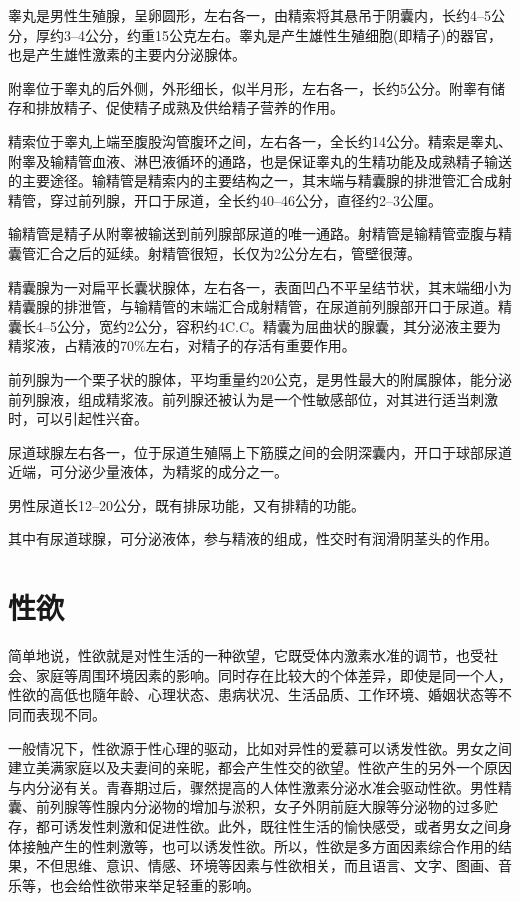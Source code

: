 \documentclass[12pt,UTF8]{ctexbook}
\begin{document}
睾丸是男性生殖腺，呈卵圆形，左右各一，由精索将其悬吊于阴囊内，长约4--5公分，厚约3--4公分，约重15公克左右。睾丸是产生雄性生殖细胞(即精子)的器官，也是产生雄性激素的主要内分泌腺体。

附睾位于睾丸的后外侧，外形细长，似半月形，左右各一，长约5公分。附睾有储存和排放精子、促使精子成熟及供给精子营养的作用。

精索位于睾丸上端至腹股沟管腹环之间，左右各一，全长约14公分。精索是睾丸、附睾及输精管血液、淋巴液循环的通路，也是保证睾丸的生精功能及成熟精子输送的主要途径。输精管是精索内的主要结构之一，其末端与精囊腺的排泄管汇合成射精管，穿过前列腺，开口于尿道，全长约40--46公分，直径约2--3公厘。

输精管是精子从附睾被输送到前列腺部尿道的唯一通路。射精管是输精管壶腹与精囊管汇合之后的延续。射精管很短，长仅为2公分左右，管壁很薄。

精囊腺为一对扁平长囊状腺体，左右各一，表面凹凸不平呈结节状，其末端细小为精囊腺的排泄管，与输精管的末端汇合成射精管，在尿道前列腺部开口于尿道。精囊长4--5公分，宽约2公分，容积约4C.C。精囊为屈曲状的腺囊，其分泌液主要为精浆液，占精液的70\%左右，对精子的存活有重要作用。

前列腺为一个栗子状的腺体，平均重量约20公克，是男性最大的附属腺体，能分泌前列腺液，组成精浆液。前列腺还被认为是一个性敏感部位，对其进行适当刺激时，可以引起性兴奋。

尿道球腺左右各一，位于尿道生殖隔上下筋膜之间的会阴深囊内，开口于球部尿道近端，可分泌少量液体，为精浆的成分之一。

男性尿道长12--20公分，既有排尿功能，又有排精的功能。

其中有尿道球腺，可分泌液体，参与精液的组成，性交时有润滑阴茎头的作用。

\part{性欲}

简单地说，性欲就是对性生活的一种欲望，它既受体内激素水准的调节，也受社会、家庭等周围环境因素的影响。同时存在比较大的个体差异，即使是同一个人，性欲的高低也隨年龄、心理状态、患病状况、生活品质、工作环境、婚姻状态等不同而表现不同。

一般情况下，性欲源于性心理的驱动，比如对异性的爱慕可以诱发性欲。男女之间建立美满家庭以及夫妻间的亲昵，都会产生性交的欲望。性欲产生的另外一个原因与内分泌有关。青春期过后，骤然提高的人体性激素分泌水准会驱动性欲。男性精囊、前列腺等性腺内分泌物的增加与淤积，女子外阴前庭大腺等分泌物的过多贮存，都可诱发性刺激和促进性欲。此外，既往性生活的愉快感受，或者男女之间身体接触产生的性刺激等，也可以诱发性欲。所以，性欲是多方面因素综合作用的结果，不但思维、意识、情感、环境等因素与性欲相关，而且语言、文字、图画、音乐等，也会给性欲带来举足轻重的影响。
\end{document}
